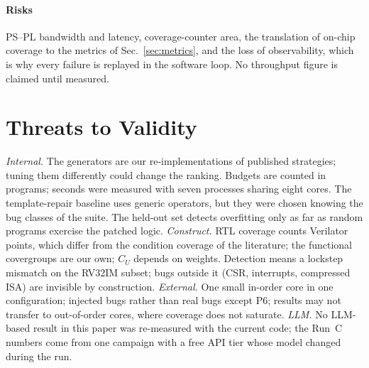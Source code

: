 \documentclass[conference,10pt]{IEEEtran}
\begin{document}
\paragraph*{Risks} PS--PL bandwidth and latency, coverage-counter area, the translation of on-chip coverage to the metrics of
Sec.~\ref{sec:metrics}, and the loss of observability, which is why every failure is replayed in the software loop. No throughput figure
is claimed until measured.

\section{Threats to Validity}\label{sec:threats}
\emph{Internal.} The generators are our re-implementations of published strategies; tuning them differently could change the ranking.
Budgets are counted in programs; seconds were measured with seven processes sharing eight cores. The template-repair baseline uses
generic operators, but they were chosen knowing the bug classes of the suite. The held-out set detects overfitting only as far as random
programs exercise the patched logic.
\emph{Construct.} RTL coverage counts Verilator points, which differ from the condition coverage of the literature; the functional
covergroups are our own; $C_U$ depends on weights. Detection means a lockstep mismatch on the RV32IM subset; bugs outside it (CSR,
interrupts, compressed ISA) are invisible by construction.
\emph{External.} One small in-order core in one configuration; injected bugs rather than real bugs except P6; results may not transfer to
out-of-order cores, where coverage does not saturate.
\emph{LLM.} No LLM-based result in this paper was re-measured with the current code; the Run~C numbers come from one campaign with a free
API tier whose model changed during the run.

\end{document}

